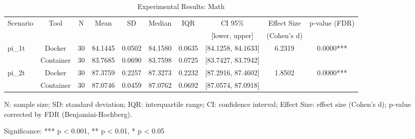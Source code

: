 \documentclass{article}
\begin{document}

\begin{table}[h]
\centering
\small
\caption{Experimental Results: Math}
\label{tab:math}
\begin{tabular}{lccccccccc}
\toprule
Scenario & Tool & N & Mean & SD & Median & IQR & CI 95\% & Effect Size & p-value (FDR) \\
 & & & & & & & [lower, upper] & (Cohen's d) & \\
\midrule
\multirow{2}{*}{pi\_1t} & Docker & 30 & 84.1445 & 0.0502 & 84.1580 & 0.0635 & [84.1258, 84.1633] & 6.2319 & 0.0000*** \\
 & Container & 30 & 83.7685 & 0.0690 & 83.7598 & 0.0725 & [83.7427, 83.7942] &  &  \\
\midrule
\multirow{2}{*}{pi\_2t} & Docker & 30 & 87.3759 & 0.2257 & 87.3273 & 0.2232 & [87.2916, 87.4602] & 1.8502 & 0.0000*** \\
 & Container & 30 & 87.0746 & 0.0459 & 87.0762 & 0.0692 & [87.0574, 87.0918] &  &  \\
\midrule
\bottomrule
\end{tabular}
\begin{tablenotes}
\small
\item N: sample size; SD: standard deviation; IQR: interquartile range; CI: confidence interval; Effect Size: effect size (Cohen's d); p-value corrected by FDR (Benjamini-Hochberg).
\item Significance: *** p < 0.001, ** p < 0.01, * p < 0.05
\end{tablenotes}
\end{table}
\end{document}
